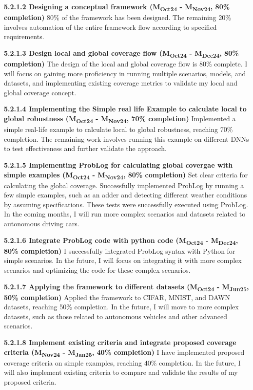 \noindent \textbf{5.2.1.2 Designing a conceptual framework (M\textsubscript{Oct24} - M\textsubscript{Nov24}, 80\% completion)} 80\% of the framework has been designed. The remaining 20\% involves automation of the entire framework flow according to specified requirements.

\noindent \textbf{5.2.1.3 Design local and global coverage flow (M\textsubscript{Oct24} - M\textsubscript{Dec24}, 80\% completion)} The design of the local and global coverage flow is 80\% complete. I will focus on gaining more proficiency in running multiple scenarios, models, and datasets, and implementing existing coverage metrics to validate my local and global coverage concept.

\noindent \textbf{5.2.1.4 Implementing the Simple real life Example to calculate local to global robustness (M\textsubscript{Oct24} - M\textsubscript{Nov24}, 70\% completion)} Implemented a simple real-life example to calculate local to global robustness, reaching 70\% completion. The remaining work involves running this example on different DNNs to test effectiveness and further validate the approach.

\noindent \textbf{5.2.1.5 Implementing ProbLog for calculating global covergae with simple examples (M\textsubscript{Oct24} - M\textsubscript{Nov24}, 80\% completion)} Set clear criteria for calculating the global coverage. Successfully implemented ProbLog by running a few simple examples, such as an adder and detecting different weather conditions by assuming specifications. These tests were successfully executed using ProbLog. In the coming months, I will run more complex scenarios and datasets related to autonomous driving cars.

\noindent \textbf{5.2.1.6 Integrate ProbLog code with python code (M\textsubscript{Oct24} - M\textsubscript{Dec24}, 80\% completion)} I successfully integrated ProbLog syntax with Python for simple scenarios. In the future, I will focus on integrating it with more complex scenarios and optimizing the code for these complex scenarios.

\noindent \textbf{5.2.1.7 Applying the framework to different datasets (M\textsubscript{Oct24} - M\textsubscript{Jun25}, 50\% completion)} Applied the framework to CIFAR, MNIST, and DAWN datasets, reaching 50\% completion. In the future, I will move to more complex datasets, such as those related to autonomous vehicles and other advanced scenarios.

\noindent \textbf{5.2.1.8 Implement existing criteria and integrate proposed coverage criteria (M\textsubscript{Nov24} - M\textsubscript{Jan25}, 40\% completion)} I have implemented proposed coverage criteria on simple examples, reaching 40\% completion. In the future, I will also implement existing criteria to compare and validate the results of my proposed criteria.

